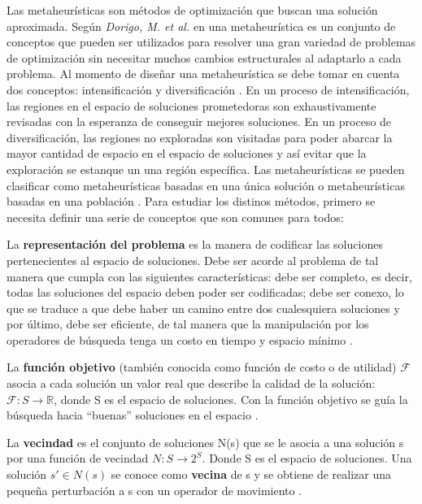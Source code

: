 Las metaheurísticas son métodos de optimización que buscan una solución aproximada. Según \emph{Dorigo, M. et al.} en \cite{Dorigo2017} una metaheurística es un conjunto de conceptos que pueden ser utilizados para resolver una gran variedad de problemas de optimización sin necesitar muchos cambios estructurales al adaptarlo a cada problema. Al momento de diseñar una metaheurística se debe tomar en cuenta dos conceptos: intensificación y diversificación \cite{talbi2009metaheuristics}. En un proceso de intensificación, las regiones en el espacio de soluciones prometedoras son exhaustivamente revisadas con la esperanza de conseguir mejores soluciones. En un proceso de diversificación, las regiones no exploradas son visitadas para poder abarcar la mayor cantidad de espacio en el espacio de soluciones y así evitar que la exploración se estanque un una región específica. Las metaheurísticas se pueden clasificar como metaheurísticas basadas en una única solución o metaheurísticas basadas en una población \cite{talbi2009metaheuristics}. Para estudiar los distinos métodos, primero se necesita definir una serie de conceptos que son comunes para todos:\\

\begin{definicion}
La \textbf{representación del problema} es la manera de codificar las soluciones pertenecientes al espacio de soluciones. Debe ser acorde al problema de tal manera que cumpla con las siguientes características: debe ser completo, es decir, todas las soluciones del espacio deben poder ser codificadas; debe ser conexo, lo que se traduce a que debe haber un camino entre dos cualesquiera soluciones y por último, debe ser eficiente, de tal manera que la manipulación por los operadores de búsqueda tenga un costo en tiempo y espacio mínimo \cite{talbi2009metaheuristics}.\\
\end{definicion}

\begin{definicion}
La \textbf{función objetivo} (también conocida como función de costo o de utilidad) $\mathcal{F}$ asocia a cada solución un valor real que describe la calidad de la solución: $\mathcal{F}: S \rightarrow \mathbb{R}$, donde S es el espacio de soluciones. Con la función objetivo se guía la búsqueda hacia ``buenas'' soluciones en el espacio \cite{talbi2009metaheuristics}.\\
\end{definicion}

\begin{definicion}
La \textbf{vecindad} es el conjunto de soluciones N(s) que se le asocia a una solución s por una función de vecindad $N:S \rightarrow 2^S$. Donde S es el espacio de soluciones. Una solución $s' \in N(s)$ se conoce como \textbf{vecina} de s y se obtiene de realizar una pequeña perturbación a s con un operador de movimiento \cite{talbi2009metaheuristics}.   
\end{definicion}

